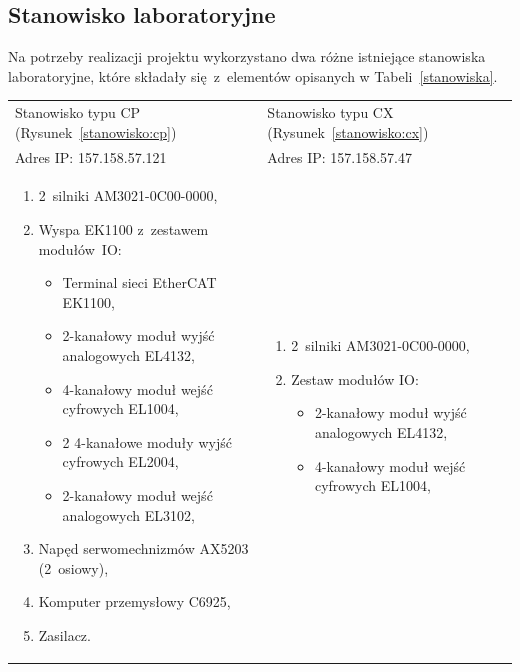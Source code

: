 \subsection{Stanowisko laboratoryjne}
Na potrzeby realizacji projektu wykorzystano dwa różne istniejące stanowiska laboratoryjne, które składały się~z~elementów opisanych w Tabeli~\ref{stanowiska}.
\begin{table}[!htb]
\begin{center}
\begin{tabular}{| p{} | p{} |}\hline
Stanowisko typu CP (Rysunek~\ref{stanowisko:cp}) & Stanowisko typu CX (Rysunek~\ref{stanowisko:cx})  \\
Adres IP: 157.158.57.121 & Adres IP: 157.158.57.47  \\\hline
\begin{enumerate}[leftmargin=7mm]
\setlength{\itemsep}{5pt}
\setlength{\parskip}{0pt}
\setlength{\parsep}{0pt}
\item 2~silniki AM3021-0C00-0000,
\item Wyspa EK1100 z~zestawem modułów~IO:
\begin{itemize}[leftmargin=3mm]
\setlength{\itemsep}{3pt}
\setlength{\parskip}{0pt}
\setlength{\parsep}{0pt}
\item Terminal sieci EtherCAT EK1100,
\item 2-kanałowy moduł wyjść analogowych EL4132,
\item 4-kanałowy moduł wejść cyfrowych EL1004,
\item 2 4-kanałowe moduły wyjść cyfrowych EL2004,
\item 2-kanałowy moduł wejść analogowych EL3102,
\end{itemize}
\item Napęd serwomechnizmów AX5203 (2~osiowy),
\item Komputer przemysłowy C6925,
\item Zasilacz.
\end{enumerate}
&
\begin{enumerate}[leftmargin=7mm]
\setlength{\itemsep}{5pt}
\setlength{\parskip}{0pt}
\setlength{\parsep}{0pt}
\item 2~silniki AM3021-0C00-0000,
\item Zestaw modułów IO:
\begin{itemize}[leftmargin=3mm]
\setlength{\itemsep}{3pt}
\setlength{\parskip}{0pt}
\setlength{\parsep}{0pt}
\item 2-kanałowy moduł wyjść analogowych EL4132,
\item 4-kanałowy moduł wejść cyfrowych EL1004,

\end{itemize}
\end{enumerate}
\end{tabular}
\end{center}
\end{table}
